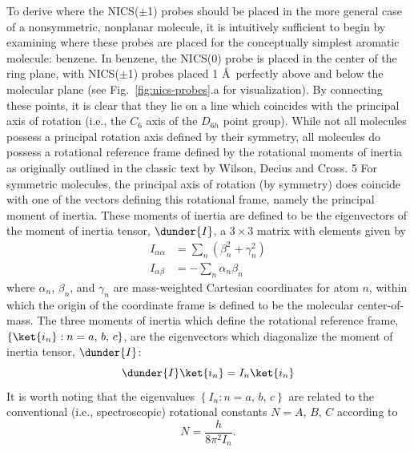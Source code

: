 \documentclass[aip,jcp,preprint,superscriptaddress,floatfix]{revtex4-1}
\begin{document}
To derive where the NICS($\pm$1) probes should be placed in the more general
case of a nonsymmetric, nonplanar molecule, it is intuitively sufficient to
begin by examining where these probes are placed for the conceptually simplest
aromatic molecule: benzene. In benzene, the NICS(0) probe is placed in the
center of the ring plane, with NICS($\pm$1) probes placed 1 \AA\ perfectly
above and below the molecular plane (see Fig.~\ref{fig:nics-probes}.a for
visualization). By connecting these points, it is clear that they lie on a line
which coincides with the principal axis of rotation (i.e., the $C_6$ axis of
the $D_{6h}$ point group). While not all molecules possess a principal rotation
axis defined by their symmetry, all molecules do possess a rotational reference
frame defined by the rotational moments of inertia as originally outlined in
the classic text by Wilson, Decius and Cross. 5 For symmetric molecules, the
principal axis of rotation (by symmetry) does coincide with one of the vectors
defining this rotational frame, namely the principal moment of inertia. These
moments of inertia are defined to be the eigenvectors of the moment of inertia
tensor, $\dunder{I}$, a $3\times3$ matrix with elements given by
\begin{align}
I_{\alpha\alpha} &= \sum_n\left(\beta_n^2 + \gamma_n^2\right)\\
I_{\alpha\beta} &= -\sum_n\alpha_n\beta_n
\end{align}
where $\alpha_n$, $\beta_n$, and $\gamma_n$ are mass-weighted Cartesian
coordinates for atom $n$, within which the origin of the coordinate frame is
defined to be the molecular center-of-mass.  The three moments of inertia which
define the rotational reference frame, $\left\{\ket{i_n}: n =
a,\,b,\,c\right\}$, are the eigenvectors which diagonalize the moment of
inertia tensor, $\dunder{I}$:
\begin{equation}
\dunder{I}\ket{i_n} = I_n\ket{i_n}
\end{equation}
It is worth noting that the eigenvalues $\left\{I_n: n = a,\,b,\,c\right\}$ are
related to the conventional (i.e., spectroscopic) rotational constants $N =
A,\, B,\, C$ according to
\begin{equation}
N = \frac{h}{8\pi^2 I_n}.
\end{equation}
\end{document}
